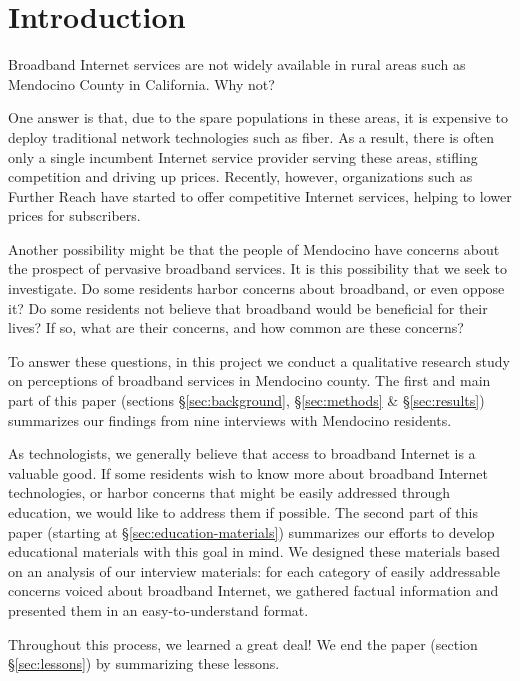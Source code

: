 \section{Introduction}
\label{sec:introduction}

Broadband Internet services are not widely available in rural areas such as Mendocino
County in California. Why not?

One answer is that, due to the spare populations in these areas, it is expensive to deploy traditional network technologies such as fiber.
As a result, there is often only a single incumbent Internet service provider serving these areas, stifling competition and driving up prices.
Recently, however, organizations such as Further Reach have started to offer competitive Internet services, helping to lower prices for subscribers.

Another possibility might be that the people of Mendocino have concerns about the prospect of pervasive broadband services. It is this possibility that we seek to investigate.
Do some residents harbor concerns about broadband, or even oppose it? Do some
residents not believe that broadband would be beneficial for their lives? If so,
what are their concerns, and how common are these concerns?

To answer these
questions, in this project we conduct a qualitative research study on
perceptions of broadband services in Mendocino county. The first and main part
of this paper (sections \S\ref{sec:background}, \S\ref{sec:methods} \& \S\ref{sec:results}) summarizes
our findings from nine interviews with Mendocino residents.

As technologists, we generally believe that access to broadband Internet is a valuable
good. If some residents wish to know more about broadband Internet technologies, or harbor concerns that might be easily addressed through
education, we would like to address them if possible. The second part of this
paper (starting at \S\ref{sec:education-materials}) summarizes our efforts to develop educational materials with this goal
in mind. We designed
these materials based on an analysis of our interview materials: for each category of
easily addressable concerns voiced about broadband Internet, we gathered
factual information and presented them in an easy-to-understand format.

Throughout this process, we learned a great deal! We end the paper (section
\S\ref{sec:lessons}) by summarizing these lessons.

